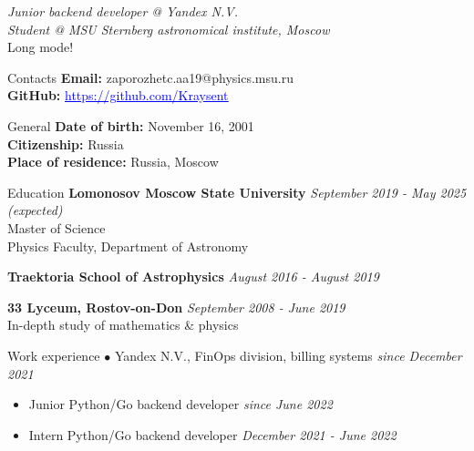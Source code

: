 \documentclass{resume} %
\newcommand{\link}[2]{\href{#1}{\textcolor{blue}{\underline{#2}}}}
\begin{document}
	\textit{Junior backend developer @ Yandex N.V.} \\
	\textit{Student @ MSU Sternberg astronomical institute, Moscow} 
	\ifdefined\LONG
		\\ Long mode!
	\fi

	\begin{rSection}{Contacts}
		\textbf{Email: } zaporozhetc.aa19@physics.msu.ru
		\\ \textbf{GitHub: } \link{https://github.com/Kraysent}{https://github.com/Kraysent}
	\end{rSection}		

	\begin{rSection}{General}
		\textbf{Date of birth:} November 16, 2001
		\\ \textbf{Citizenship:} Russia
		\\ \textbf{Place of residence:} Russia, Moscow
	\end{rSection}

	\begin{rSection}{Education}
		\textbf{Lomonosov Moscow State University} \hfill \textit{September 2019 - May 2025 (expected)}
		\\ Master of Science
		\\ Physics Faculty, Department of Astronomy

		\textbf{Traektoria School of Astrophysics} \hfill \textit{August 2016 - August 2019}

		\textbf{33 Lyceum, Rostov-on-Don} \hfill \textit{September 2008 - June 2019}
		\\ In-depth study of mathematics \& physics
	\end{rSection}
	
	\begin{rSection}{Work experience}
		$\bullet$ Yandex N.V., FinOps division, billing systems \hfill \textit{since December 2021}
		\begin{itemize}
			\item Junior Python/Go backend developer \hfill \textit{since June 2022}
			\item Intern Python/Go backend developer \hfill \textit{December 2021 - June 2022}
		\end{itemize}
    \end{rSection}
    
\end{document}
